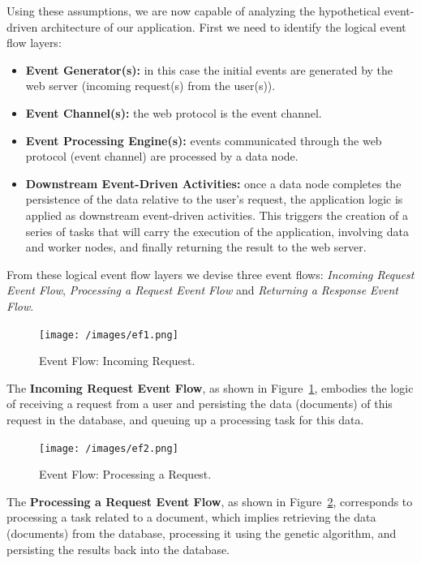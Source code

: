 \documentclass[12pt, titlepage]{uo_temp}
\begin{document}
     Using these assumptions, we are now capable of analyzing the hypothetical event-driven
     architecture of our application. 
     First we need to identify the logical event flow layers:
     \begin{itemize}
     \item \textbf{Event Generator(s):} in this case the initial events are generated by
       the web server (incoming request(s) from the user(s)).
     \item \textbf{Event Channel(s):} the web protocol is the event channel.
     \item \textbf{Event Processing Engine(s):} events communicated through the web
       protocol (event channel) are processed by a data node.
     \item \textbf{Downstream Event-Driven Activities:} once a data node completes the
       persistence of the data relative to the user's request, the application logic is
       applied as downstream event-driven activities. This triggers the creation of
       a series of tasks that will carry the execution of the application, involving data
       and worker nodes, and finally returning the result to the web server.
     \end{itemize}
     From these logical event flow layers we devise three event flows: \emph{Incoming
       Request Event Flow}, \emph{Processing a Request Event Flow} and \emph{Returning a
       Response Event Flow}.
     
     \begin{figure}[h]
       \texttt{[image: /images/ef1.png]}
       \caption{Event Flow: Incoming Request.}
       \label{ef1}
     \end{figure}

     The \textbf{Incoming Request Event Flow}, as shown in Figure~\ref{ef1}, embodies the
     logic of receiving a request from a user and persisting the data (documents) of this
     request in the database, and queuing up a processing task for this data.

     \begin{figure}
       \texttt{[image: /images/ef2.png]}
       \caption{Event Flow: Processing a Request.}
       \label{ef2}
     \end{figure}

     The \textbf{Processing a Request Event Flow}, as shown in Figure~\ref{ef2},
     corresponds to processing a task related to a document, which implies retrieving the data
     (documents) from the database, processing it using the genetic algorithm, and persisting
     the results back into the database.
\end{document}
